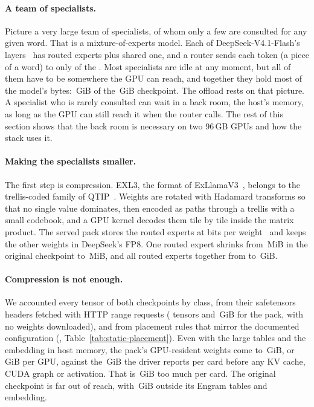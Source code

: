 \paragraph{A team of specialists.}
Picture a very large team of specialists, of whom only a few are consulted for any given word. That is a
mixture-of-experts model. Each of DeepSeek-V4.1-Flash's 
layers~\citep{deepseekai2026v41flash,deepseekai2026v41flashcard} has  routed experts plus
 shared one, and a router sends each token (a piece of a word) to only
 of the . Most specialists are idle at any moment, but all of them
have to be somewhere the GPU can reach, and together they hold most of the model's bytes:
\,GiB of the \,GiB checkpoint. The offload rests on that
picture. A specialist who is rarely consulted can wait in a back room, the host's memory, as long as the GPU can still
reach it when the router calls. The rest of this section shows that the back room is necessary on two 96\,GB GPUs and
how the stack uses it.

\paragraph{Making the specialists smaller.}
The first step is compression. EXL3, the format of ExLlamaV3~\citep{turboderp2026exllamav3}, belongs to the
trellis-coded family of QTIP~\citep{tseng2024qtip}. Weights are rotated with Hadamard transforms so that no single
value dominates, then encoded as paths through a trellis with a small codebook, and a GPU kernel decodes them tile by
tile inside the matrix product. The served pack stores the routed experts at  bits per
weight~\citep{coolbho3k2026dsv41exl3} and keeps the other weights in DeepSeek's FP8. One routed expert shrinks from
\,MiB in the original checkpoint to \,MiB, and all routed experts
together from  to \,GiB.

\paragraph{Compression is not enough.}\label{sec:system}
We accounted every tensor of both checkpoints by class, from their safetensors headers fetched with HTTP range
requests ( tensors and \,GiB for the pack, with no weights
downloaded), and from placement rules that mirror the documented configuration
(, Table~\ref{tab:static-placement}). Even with the large tables and the
embedding in host memory, the pack's GPU-resident weights come to \,GiB, or
\,GiB per GPU, against the \,GiB the driver reports per
card before any KV cache, CUDA graph or activation. That is \,GiB too much per card.
The original checkpoint is far out of reach, with \,GiB outside its Engram tables and
embedding.

